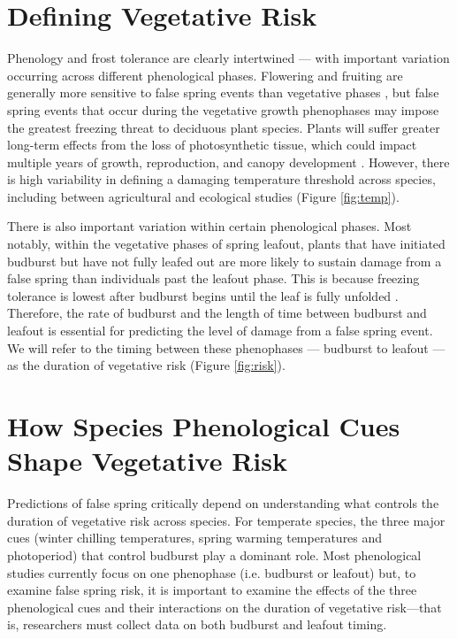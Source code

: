 \documentclass{article}\usepackage[]{graphicx}\usepackage[]{color}
\begin{document}
\section* {Defining Vegetative Risk} %
Phenology and frost tolerance are clearly intertwined --- with important variation occurring across different phenological phases. Flowering and fruiting are generally more sensitive to false spring events than vegetative phases \citep{Augspurger2009, Caradonna2016, Lenz2013}, but false spring events that occur during the vegetative growth phenophases may impose the greatest freezing threat to deciduous plant species.  Plants will suffer greater long-term effects from the loss of photosynthetic tissue, which could impact multiple years of growth, reproduction, and canopy development \citep{Vitasse2014, Xie2015}. However, there is high variability in defining a damaging temperature threshold across species, including between agricultural and ecological studies (Figure \ref{fig:temp}).

There is also important variation within certain phenological phases. Most notably, within the vegetative phases of spring leafout, plants that have initiated budburst but have not fully leafed out are more likely to sustain damage from a false spring than individuals past the leafout phase. This is because freezing tolerance is lowest after budburst begins until the leaf is fully unfolded \citep{Lenz2016}. Therefore, the rate of budburst and the length of time between budburst and leafout is essential for predicting the level of damage from a false spring event. We will refer to the timing between these phenophases --- budburst to leafout --- as the duration of vegetative risk (Figure \ref{fig:risk}). %

\section* {How Species Phenological Cues Shape Vegetative Risk}
Predictions of false spring critically depend on understanding what controls the duration of vegetative risk across species. For temperate species, the three major cues (winter chilling temperatures, spring warming temperatures and photoperiod) that control budburst \citep%
{Chuine2010} play a dominant role. Most phenological studies currently focus on one phenophase (i.e. budburst or leafout) but, to examine false spring risk, it is important to examine the effects of the three phenological cues and their interactions on the duration of vegetative risk---that is, researchers must collect data on both budburst and leafout timing.  
\end{document}

